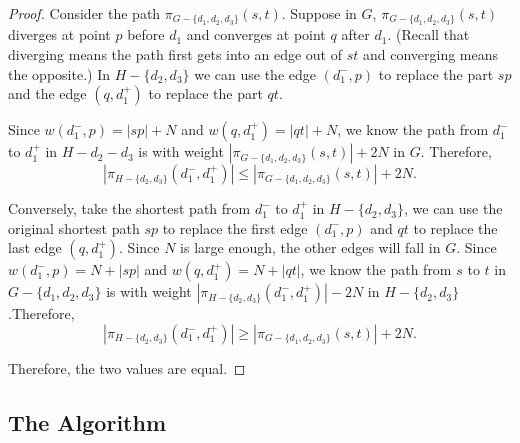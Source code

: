 \documentclass[11pt]{article}
\theoremstyle{plain}
\theoremstyle{definition}
\newcommand{\set}[1]{\{ #1 \}}
\newcommand{\og}[3]{\pi_{G-#3}\left(#1,#2\right)}
\newcommand{\hg}[3]{\pi_{H-#3}\left(#1,#2\right)}
\begin{document}
\begin{center}
 \end{center}

\begin{proof}
    Consider the path $\og{s}{t}{\set{d_1, d_2, d_3}}$. Suppose in $G$, $\og{s}{t}{\set{d_1, d_2, d_3}}$ diverges at point $p$ before $d_1$ and converges at point $q$ after $d_1$. (Recall that diverging means the path first gets into an edge out of $st$ and converging means the opposite.) In $H-\set{d_2, d_3}$ we can use the edge $(d_1^-,p)$ to replace the part $sp$ and the edge $(q,d_1^+)$ to replace the part $qt$. 
    
    Since $w(d_1^-,p) = |sp| + N$ and $w(q,d_1^+) = |qt| + N$, we know the path from $d_1^-$ to $d_1^+$ in $H-d_2-d_3$ is with weight $|\og{s}{t}{\set{d_1, d_2, d_3}}|+2N$ in $G$. Therefore, 
    $$|\hg{d_1^-}{d_1^+}{\set{d_2, d_3}}| \leq |\og{s}{t}{\set{d_1, d_2, d_3}}| + 2N.$$

    Conversely, take the shortest path from $d_1^-$ to $d_1^+$ in $H-\set{d_2, d_3}$, we can use the original shortest path $sp$ to replace the first edge $(d_1^-,p)$ and $qt$ to replace the last edge $(q,d_1^+)$. Since $N$ is large enough, the other edges will fall in $G$. Since $w(d_1^-,p) = N + |sp|$ and $w(q,d_1^+) = N + |qt|$, we know the path from $s$ to $t$ in $G-\set{d_1,d_2,d_3}$ is with weight $|\hg{d_1^-}{d_1^+}{\set{d_2, d_3}}|-2N$ in $H-\set{d_2, d_3}$.Therefore, 
    $$|\hg{d_1^-}{d_1^+}{\set{d_2, d_3}}| \geq |\og{s}{t}{\set{d_1, d_2, d_3}}| + 2N.$$

    Therefore, the two values are equal.
\end{proof}

\subsection{The Algorithm}
\end{document}
